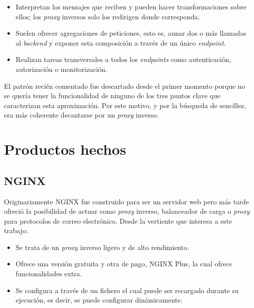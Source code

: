 \documentclass[11pt,spanish,listoffigures]{tfgetsinf}
\begin{document}
\begin{itemize}

	\item Interpretan los mensajes que reciben y pueden hacer transformaciones sobre ellos; los \emph{proxy} inversos solo los redirigen donde corresponda.
	
	\item Suelen ofrecer agregaciones de peticiones, esto es, aunar dos o más llamadas al \emph{backend} y exponer esta composición a través de un único \emph{endpoint}.
	
	\item Realizan tareas transversales a todos los \emph{endpoints} como autenticación, autorización o monitorización.

\end{itemize}

El patrón recién comentado fue descartado desde el primer momento porque no se quería tener la funcionalidad de ninguno de los tres puntos clave que caracterizan esta aproximación. Por este motivo, y por la búsqueda de sencillez, era más coherente decantarse por un \emph{proxy} inverso.


	\section{Productos hechos}


		\subsection{NGINX}

Originariamente NGINX \cite{NGINX} fue construido para ser un servidor web pero más tarde ofreció la posibilidad de actuar como \emph{proxy} inverso, balanceador de carga o \emph{proxy} para protocolos de correo electrónico. Desde la vertiente que interesa a este trabajo:

\begin{itemize}

	\item Se trata de un \emph{proxy} inverso ligero y de alto rendimiento.

	\item Ofrece una versión gratuita y otra de pago, NGINX Plus, la cual ofrece funcionalidades extra.

	\item Se configura a través de un fichero el cual puede ser recargado durante su ejecución, es decir, se puede configurar dinámicamente.

\end{itemize}
\end{document}
